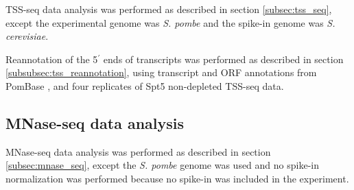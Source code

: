 TSS-seq data analysis was performed as described in section \ref{subsec:tss_seq}, except the experimental genome was \textit{S. pombe} and the spike-in genome was \textit{S. cerevisiae}.

Reannotation of the 5$^\prime$ ends of transcripts was performed as described in section \ref{subsubsec:tss_reannotation}, using transcript and ORF annotations from PomBase \citep{lock2018}, and four replicates of Spt5 non-depleted TSS-seq data.

\subsection{MNase-seq data analysis}

MNase-seq data analysis was performed as described in section \ref{subsec:mnase_seq}, except the \textit{S. pombe} genome was used and no spike-in normalization was performed because no spike-in was included in the experiment.

\newpage

\begingroup
    \singlespacing
    
\endgroup
